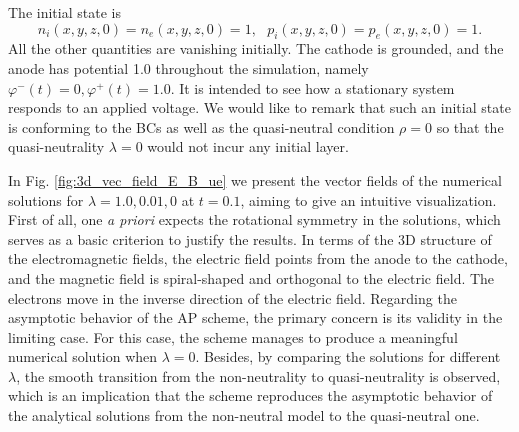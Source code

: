 \documentclass{report}
\begin{document}
The initial state is
\begin{equation*}
    n_i(x,y,z,0) = n_e(x,y,z,0) = 1, \ \ \  p_i(x,y,z,0) = p_e(x,y,z,0) = 1.
\end{equation*}
All the other quantities are vanishing initially. The cathode is grounded, and the anode has potential 1.0 throughout the simulation, namely $\varphi^-(t) = 0, \varphi^+(t) = 1.0$. It is intended to see how a stationary system responds to an applied voltage. We would like to remark that such an initial state is conforming to the BCs as well as the quasi-neutral condition $\rho = 0$ so that the quasi-neutrality $\lambda  = 0$ would not incur any initial layer. 

In Fig. \ref{fig:3d_vec_field_E_B_ue} we present the vector fields of the numerical solutions for $\lambda = 1.0, 0.01, 0$ at $t = 0.1$, aiming to give an intuitive visualization. First of all, one \emph{a priori} expects the rotational symmetry in the solutions, which serves as a basic criterion to justify the results. In terms of the 3D structure of the electromagnetic fields, the electric field points from the anode to the cathode, and the magnetic field is spiral-shaped and orthogonal to the electric field. The electrons move in the inverse direction of the electric field. Regarding the asymptotic behavior of the AP scheme, the primary concern is its validity in the limiting case. For this case, the scheme manages to produce a meaningful numerical solution when $\lambda = 0$. Besides, by comparing the solutions for different $\lambda$, the smooth transition from the non-neutrality to quasi-neutrality is observed, which is an implication that the scheme reproduces the asymptotic behavior of the analytical solutions from the non-neutral model to the quasi-neutral one.
\end{document}
